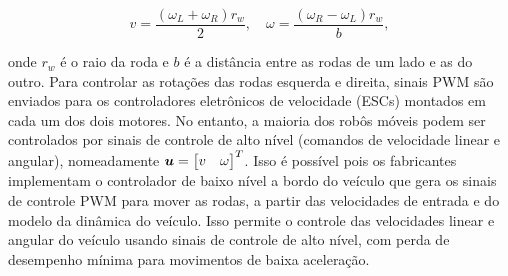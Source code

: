     \begin{equation} 
    v = \frac{(\omega_L + \omega_R)r_w}{2},\quad \omega = \frac{\left(\omega_R - \omega_L\right)r_w}{b}, 
    \end{equation} 
    
    onde $r_w$ é o raio da roda e $b$ é a distância entre as rodas de um lado e as do outro. Para controlar as rotações das rodas esquerda e direita, sinais PWM são enviados para os controladores eletrônicos de velocidade (ESCs) montados em cada um dos dois motores. No entanto, a maioria dos robôs móveis podem ser controlados por sinais de controle de alto nível (comandos de velocidade linear e angular), nomeadamente \( \boldsymbol{u} = \begin{bmatrix} v & \omega \end{bmatrix}^T \). Isso é possível pois os fabricantes implementam o controlador de baixo nível a bordo do veículo que gera os sinais de controle PWM para mover as rodas, a partir das velocidades de entrada e do modelo da dinâmica do veículo. Isso permite o controle das velocidades linear e angular do veículo usando sinais de controle de alto nível, com perda de desempenho mínima para movimentos de baixa aceleração.


        
        
        
